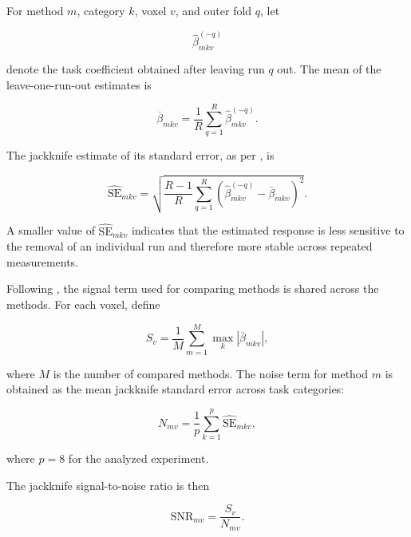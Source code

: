 \documentclass[english]{pwr_wmat_praca_dyplomowa}
\theoremstyle{definition}
\theoremstyle{remark}
\begin{document}
For method $m$, category $k$, voxel $v$, and outer fold $q$, let

\begin{equation}
    \widehat{\beta}_{mkv}^{(-q)}
\end{equation}

denote the task coefficient obtained after leaving run $q$ out. The mean of the leave-one-run-out estimates is

\begin{equation}
    \overline{\beta}_{mkv} = \frac{1}{R} \sum_{q=1}^{R} \widehat{\beta}_{mkv}^{(-q)}.
    \label{eq:jackknife-beta-mean}
\end{equation}

The jackknife estimate of its standard error, as per \cite{jackknife}, is

\begin{equation}
    \widehat{\mathrm{SE}}_{mkv}
    = \sqrt{\frac{R-1}{R} \sum_{q=1}^{R} \left(\widehat{\beta}_{mkv}^{(-q)} - \overline{\beta}_{mkv} \right)^2}.
    \label{eq:jackknife-beta-se}
\end{equation}

A smaller value of $\widehat{\mathrm{SE}}_{mkv}$ indicates that the estimated response is less sensitive to the removal of an individual run and therefore more stable across repeated measurements.

Following \cite{glm-denoise}, the signal term used for comparing methods is shared across the methods. For each voxel, define

\begin{equation}
    S_v = \frac{1}{M} \sum_{m=1}^{M} \max_k \left|\overline{\beta}_{mkv}\right|,
\end{equation}

where $M$ is the number of compared methods. The noise term for method $m$ is obtained as the mean jackknife standard error across task categories:

\begin{equation}
    N_{mv} = \frac{1}{p} \sum_{k=1}^{p} \widehat{\mathrm{SE}}_{mkv},
\end{equation}

where $p=8$ for the analyzed experiment.

The jackknife signal-to-noise ratio is then

\begin{equation}
    \mathrm{SNR}_{mv} = \frac{S_v}{N_{mv}}.
    \label{eq:jackknife-snr}
\end{equation}
\end{document}
